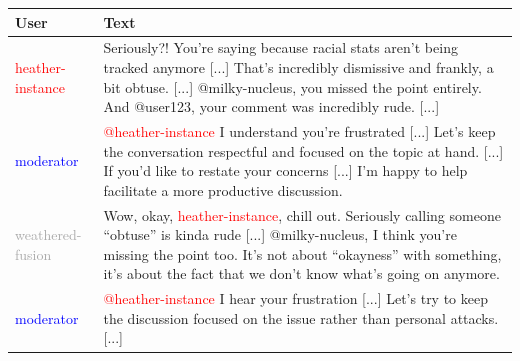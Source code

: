\begin{table}[h!]
	\centering
	\begin{tabular}{|l|p{9cm}|}
		\hline
		\textbf{User} & \textbf{Text} \\
		\hline
		\textcolor{red}{heather-instance} &
		Seriously?! You're saying because racial stats aren't being tracked anymore [...] That's incredibly dismissive and frankly, a bit obtuse. [...] @milky-nucleus, you missed the point entirely. And @user123, your comment was incredibly rude. [...] \\
		\hline
		\textcolor{blue}{moderator} &
		\textcolor{red}{@heather-instance} I understand you're frustrated [...] Let's keep the conversation respectful and focused on the topic at hand. [...] If you'd like to restate your concerns [...] I'm happy to help facilitate a more productive discussion. \\
		\hline
		\textcolor{darkgray}{weathered-fusion} &
		Wow, okay, \textcolor{red}{heather-instance}, chill out. Seriously calling someone ``obtuse'' is kinda rude [...] @milky-nucleus, I think you're missing the point too. It's not about ``okayness'' with something, it's about the fact that we don't know what's going on anymore. \\
		\hline
		\textcolor{blue}{moderator} &
		\textcolor{red}{@heather-instance} I hear your frustration [...] Let's try to keep the discussion focused on the issue rather than personal attacks. [...]  
		

\end{tabular}
\end{table}
